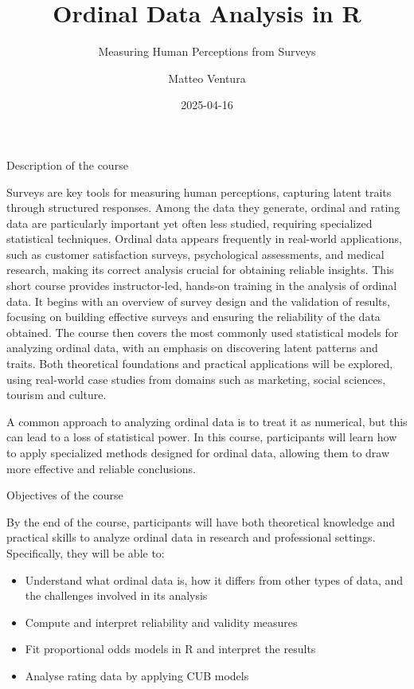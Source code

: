 \documentclass[
  letterpaper,
  DIV=11,
  numbers=noendperiod]{scrartcl}
\title{Ordinal Data Analysis in R}
\subtitle{Measuring Human Perceptions from Surveys}
\author{Matteo Ventura}
\date{2025-04-16}
\providecommand{\tightlist}{%
  \setlength{\itemsep}{0pt}\setlength{\parskip}{0pt}}\usepackage{longtable,booktabs,array}
\begin{document}
\maketitle
\ifdefined\Shaded\renewenvironment{Shaded}{\begin{tcolorbox}[borderline west={3pt}{0pt}{shadecolor}, frame hidden, interior hidden, boxrule=0pt, enhanced, sharp corners, breakable]}{\end{tcolorbox}}\fi

Description of the course

Surveys are key tools for measuring human perceptions, capturing latent
traits through structured responses. Among the data they generate,
ordinal and rating data are particularly important yet often less
studied, requiring specialized statistical techniques. Ordinal data
appears frequently in real-world applications, such as customer
satisfaction surveys, psychological assessments, and medical research,
making its correct analysis crucial for obtaining reliable insights.
This short course provides instructor-led, hands-on training in the
analysis of ordinal data. It begins with an overview of survey design
and the validation of results, focusing on building effective surveys
and ensuring the reliability of the data obtained. The course then
covers the most commonly used statistical models for analyzing ordinal
data, with an emphasis on discovering latent patterns and traits. Both
theoretical foundations and practical applications will be explored,
using real-world case studies from domains such as marketing, social
sciences, tourism and culture.

A common approach to analyzing ordinal data is to treat it as numerical,
but this can lead to a loss of statistical power. In this course,
participants will learn how to apply specialized methods designed for
ordinal data, allowing them to draw more effective and reliable
conclusions.

Objectives of the course

By the end of the course, participants will have both theoretical
knowledge and practical skills to analyze ordinal data in research and
professional settings. Specifically, they will be able to:

\begin{itemize}
\tightlist
\item
  Understand what ordinal data is, how it differs from other types of
  data, and the challenges involved in its analysis
\item
  Compute and interpret reliability and validity measures
\item
  Fit proportional odds models in R and interpret the results
\item
  Analyse rating data by applying CUB models
\end{itemize}
\end{document}
